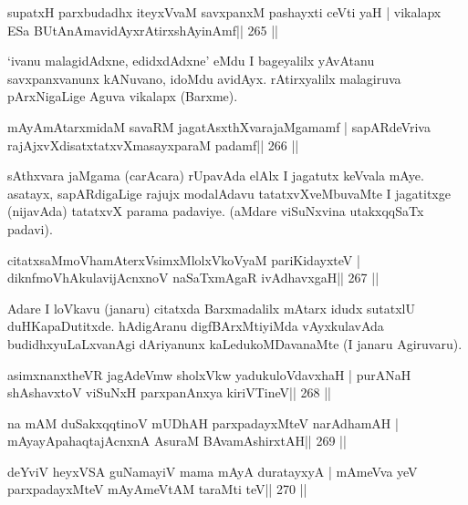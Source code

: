 \begin{shl}
supatxH parxbudadhx iteyxVvaM savxpanxM pashayxti ceVti yaH |
vikalapx ESa BUtAnAmavidAyxrAtirxshAyinAmf\hfill || 265 ||
\end{shl}

\begin{artha}
`ivanu malagidAdxne, edidxdAdxne' eMdu I bageyalilx yAvAtanu  savxpanxvanunx kANuvano, idoMdu avidAyx. rAtirxyalilx malagiruva pArxNigaLige Aguva vikalapx (Barxme).
\end{artha}


\begin{shl}
mAyAmAtarxmidaM savaRM jagatAsxthXvarajaMgamamf |
sapARdeVriva rajAjxvXdisatxtatxvXmasayxparaM padamf\hfill || 266 ||
\end{shl}

\begin{artha}
sAthxvara jaMgama (carAcara) rUpavAda elAlx I jagatutx keVvala mAye. 
asatayx, sapARdigaLige rajujx modalAdavu tatatxvXveMbuvaMte I 
jagatitxge (nijavAda) tatatxvX parama padaviye. (aMdare viSuNxvina utakxqqSaTx padavi).
\end{artha}

\begin{shl}
citatxsaMmoVhamAterxVsimxMlolxVkoV\s yaM pariKidayxteV |
diknfmoVhAkulavijAcnxnoV naSaTxmAgaR ivAdhavxgaH\hfill || 267 ||
\end{shl}

\begin{artha}
Adare I loVkavu (janaru) citatxda Barxmadalilx mAtarx idudx sutatxlU  duHKapaDutitxde. hAdigAranu digfBArxMtiyiMda vAyxkulavAda budidhxyuLaLxvanAgi dAriyanunx kaLedukoMDavanaMte (I janaru Agiruvaru).
\end{artha}

\begin{shl}
asimxnanxtheVR jagAdeVmw sholxVkw yadukuloVdavxhaH |
purANaH shAshavxtoV viSuNxH parxpanAnxya kiriVTineV\hfill || 268 ||
\end{shl}

\begin{shl}
na mAM duSakxqqtinoV mUDhAH parxpadayxMteV narAdhamAH |
mAyayA\s pahaqtajAcnxnA AsuraM BAvamAshirxtAH\hfill || 269 ||
\end{shl}

\begin{shl}
deYviV heyxVSA guNamayiV mama mAyA duratayxyA |
mAmeVva yeV parxpadayxMteV mAyAmeVtAM taraMti teV\hfill || 270 ||
\end{shl}

